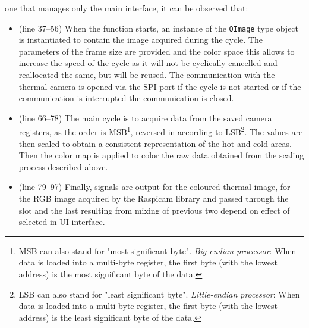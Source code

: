 one that manages only the main interface, it can be observed that:
\begin{itemize}
\item (line 37--56) When the function starts, an instance of the \texttt{QImage} type object is
instantiated to contain the image acquired during the cycle. The parameters of the
frame size are provided and the color space this allows to increase the speed of
the cycle as it will not be cyclically cancelled and reallocated the same, but
will be reused. The communication with the thermal camera is opened via the SPI
port if the cycle is not started or if the communication is interrupted the
communication is closed.
%
\item (line 66--78) The main cycle is to acquire data from the saved camera registers, as the
order is MSB\footnote{MSB can also stand for "most significant byte".
\emph{Big-endian processor}: When data is loaded into a multi-byte register, the
first byte (with the lowest address) is the most significant byte of the
data.\cite{56322}}, reversed in according to LSB\footnote{LSB can also stand
for "least significant byte". \emph{Little-endian processor}: When data is
loaded into a multi-byte register, the first byte (with the lowest address) is
the least significant byte of the data.\cite{56322}}. The values are then scaled
to obtain a consistent representation of the hot and cold areas. Then the color
map is applied to color the raw data obtained from the scaling process described
above.
\item (line 79--97) Finally, signals are output for the coloured thermal image, for the RGB
image acquired by the Raspicam library and passed through the slot and the last
resulting from mixing of previous two depend on effect of selected in UI interface.
\end{itemize}
